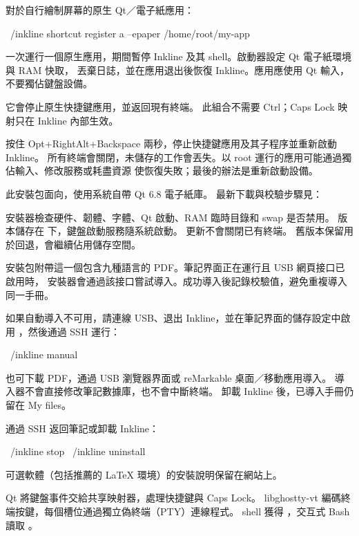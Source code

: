 對於自行繪制屏幕的原生 Qt／電子紙應用：
\begin{shell}
~/inkline shortcut register a --epaper /home/root/my-app
\end{shell}
一次運行一個原生應用，期間暫停 Inkline 及其 shell。啟動器設定 Qt 電子紙環境與 RAM 快取，
丟棄日誌，並在應用退出後恢復 Inkline。應用應使用 Qt 輸入，不要獨佔鍵盤設備。

\begin{notice}
它會停止原生快捷鍵應用，並返回現有終端。
此組合不需要 Ctrl；Caps Lock 映射只在 Inkline 內部生效。
\end{notice}

按住 Opt+RightAlt+Backspace 兩秒，停止快捷鍵應用及其子程序並重新啟動 Inkline。
所有終端會關閉，未儲存的工作會丟失。以 root 運行的應用可能通過獨佔輸入、修改服務或耗盡資源
使恢復失敗；最後的辦法是重新啟動設備。

此安裝包面向，使用系統自帶 Qt 6.8 電子紙庫。
最新下載與校驗步驟見：

\InstallLink

安裝器檢查硬件、韌體、字體、Qt 啟動、RAM 臨時目錄和 swap 是否禁用。
版本儲存在  下，鍵盤啟動服務隨系統啟動。
更新不會關閉已有終端。
舊版本保留用於回退，會繼續佔用儲存空間。

安裝包附帶這一個包含九種語言的 PDF。筆記界面正在運行且 USB 網頁接口已啟用時，
安裝器會通過該接口嘗試導入。成功導入後記錄校驗值，避免重複導入同一手冊。

如果自動導入不可用，請連線 USB、退出 Inkline，並在筆記界面的儲存設定中啟用
，然後通過 SSH 運行：
\begin{shell}
~/inkline manual
\end{shell}
也可下載 PDF，通過 USB 瀏覽器界面或 reMarkable 桌面／移動應用導入。
導入器不會直接修改筆記數據庫，也不會中斷終端。
卸載 Inkline 後，已導入手冊仍留在 My files。

通過 SSH 返回筆記或卸載 Inkline：
\begin{shell}
~/inkline stop
~/inkline uninstall
\end{shell}
可選軟體（包括推薦的 LaTeX 環境）的安裝說明保留在網站上。

Qt 將鍵盤事件交給共享映射器，處理快捷鍵與 Caps Lock。
libghostty-vt 編碼終端按鍵，每個槽位通過獨立偽終端（PTY）連線程式。
shell 獲得 ，交互式 Bash 讀取 。

